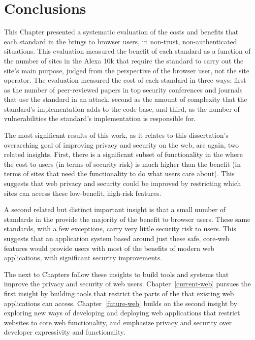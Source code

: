 \section{Conclusions}
\label{cost-benefit:conclusions}

This Chapter presented a systematic evaluation of the costs and benefits that
each standard in the \WAPI brings to browser users, in non-trust,
non-authenticated situations.  This evaluation measured the benefit of each
standard as a function of the number of sites in the Alexa 10k that require
the standard to carry out the site's main purpose, judged from the perspective
of the browser user, not the site operator.  The evaluation measured the cost
of each standard in three ways: first as the number of peer-reviewed papers
in top security conferences and journals that use the standard in an attack,
second as the amount of complexity that the standard's implementation adds
to the code base, and third, as the number of vulnerabilities the standard's
implementation is responsible for.

The most significant results of this work, as it relates to this dissertation's
overarching goal of improving privacy and security on the web, are again, two
related insights.  First, there is a significant subset of functionality in
the \WAPI where the cost to users (in terms of security risk) is much higher
than the benefit (in terms of sites that need the functionality to do what
users care about).  This suggests that web privacy and security could be
improved by restricting which sites can access these low-benefit, high-risk
features.

A second related but distinct important insight is that a small number of
standards in the \WAPI provide the majority of the benefit to browser users.
These same standards, with a few exceptions, carry very little security risk
to users.  This suggests that an application system based around just these
safe, core-web features would provide users with most of the benefits of
modern web applications, with significant security improvements.

The next to Chapters follow these insights to build tools and systems that
improve the privacy and security of web users.  Chapter~\ref{current-web}
pursues the first insight by building tools that restrict the parts of the
\WAPI that existing web applications can access.  Chapter~\ref{future-web}
builds on the second insight by exploring new ways of developing and deploying
web applications that restrict websites to core web functionality, and
emphasize privacy and security over developer expressivity and functionality.
